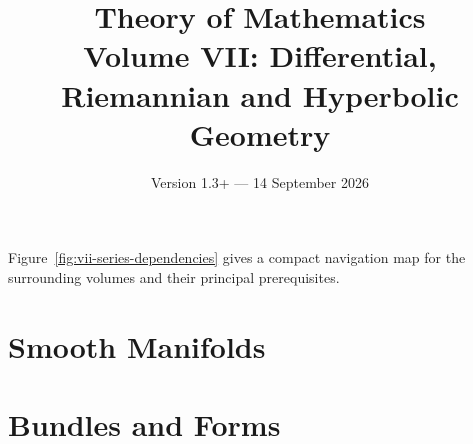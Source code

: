 \documentclass[11pt,a4paper,openany]{book}
\title{Theory of Mathematics\\[0.5em]\Large Volume VII: Differential, Riemannian and Hyperbolic Geometry}
\author{}
\date{Version 1.3+ --- 14 September 2026}
\begin{document}
\maketitle
\clearpage

\frontmatter
\tableofcontents


Figure~\ref{fig:vii-series-dependencies} gives a compact navigation map for the
surrounding volumes and their principal prerequisites.



\mainmatter


\part{Smooth Manifolds}









\part{Bundles and Forms}






\end{document}
